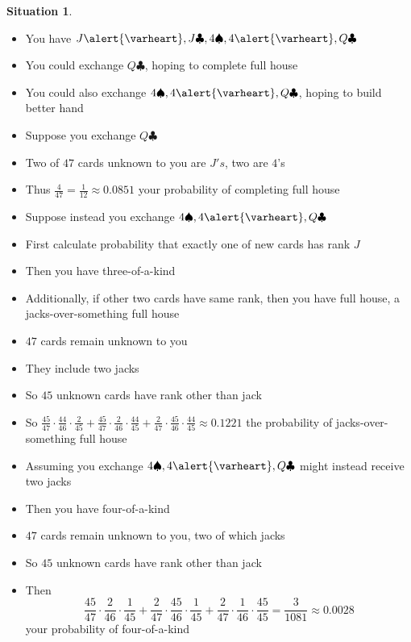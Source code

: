 \documentclass[handout]{beamer}
\theoremstyle{definition}
\newtheorem{situation}{Situation}
\newcommand{\hs}{\alert{\varheart}}
\newcommand{\s}{\spadesuit}
\newcommand{\cs}{\clubsuit}
\begin{document}
\begin{frame}
\begin{situation}
\begin{itemize}
\item You have $J\hs,J\cs,4\s,4\hs,Q\cs$
\item You could exchange $Q\cs$, hoping to complete full house
\item You could also exchange $4\s,4\hs,Q\cs$, hoping to build better hand
\end{itemize}
\end{situation}
\begin{itemize}
\item Suppose you exchange $Q\cs$
\item Two of $47$ cards unknown to you are $J's$, two are $4$'s
\item Thus $\frac{4}{47}=\frac{1}{12}\approx 0.0851$ your probability
of completing full house
\end{itemize}
\end{frame}

\begin{frame}
\begin{itemize}
\item Suppose instead you exchange $4\s,4\hs,Q\cs$
\item First calculate probability that exactly one of new cards
has rank $J$
\item Then you have three-of-a-kind
\item Additionally, if other two cards have same rank,
then you have full house, a \alert{jacks-over-something full house}
\item $47$ cards remain unknown to you
\item They include two jacks
\item So $45$ unknown cards have rank other than jack
\item So $\frac{45}{47}\cdot\frac{44}{46}\cdot\frac{2}{45}
+\frac{45}{47}\cdot\frac{2}{46}\cdot\frac{44}{45}
+\frac{2}{47}\cdot\frac{45}{46}\cdot\frac{44}{45}\approx 0.1221$
the probability of jacks-over-something full house
\end{itemize}
\end{frame}

\begin{frame}
\begin{itemize}
\item Assuming you exchange $4\s,4\hs,Q\cs$
might instead receive \alert{two} jacks
\item Then you have four-of-a-kind
\item $47$ cards remain unknown to you, two of which jacks
\item So $45$ unknown cards have rank other than jack
\item Then \[\frac{45}{47}\cdot\frac{2}{46}\cdot\frac{1}{45}
+\frac{2}{47}\cdot\frac{45}{46}\cdot\frac{1}{45}
+\frac{2}{47}\cdot\frac{1}{46}\cdot\frac{45}{45}
=\frac{3}{1081}\approx 0.0028\]
your probability of four-of-a-kind
\end{itemize}
\end{frame}
\end{document}
